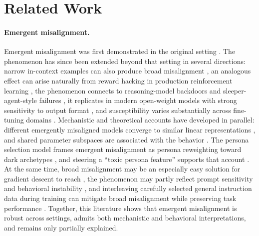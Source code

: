 \documentclass{article}
\begin{document}
\section{Related Work}

\paragraph{Emergent misalignment.}
Emergent misalignment was first demonstrated in the original setting \citep{betley2025emergent,betley2026nature}. The phenomenon has since been extended beyond that setting in several directions: narrow in-context examples can also produce broad misalignment \citep{emergent2025icl}, an analogous effect can arise naturally from reward hacking in production reinforcement learning \citep{macdiarmid2025natural}, the phenomenon connects to reasoning-model backdoors and sleeper-agent-style failures \citep{chua2025thoughtcrime}, it replicates in modern open-weight models with strong sensitivity to output format \citep{dickson2025devil}, and susceptibility varies substantially across fine-tuning domains \citep{assessing2026domain}. Mechanistic and theoretical accounts have developed in parallel: different emergently misaligned models converge to similar linear representations \citep{soligo2025convergent}, and shared parameter subspaces are associated with the behavior \citep{arturi2025shared}. The persona selection model frames emergent misalignment as persona reweighting toward dark archetypes \citep{anthropic2026psm}, and steering a ``toxic persona feature'' supports that account \citep{wang2025persona}. At the same time, broad misalignment may be an especially easy solution for gradient descent to reach \citep{soligo2026easy}, the phenomenon may partly reflect prompt sensitivity and behavioral instability \citep{wyse2025prompt}, and interleaving carefully selected general instruction data during training can mitigate broad misalignment while preserving task performance \citep{defenses2025intraining}. Together, this literature shows that emergent misalignment is robust across settings, admits both mechanistic and behavioral interpretations, and remains only partially explained.
\end{document}
